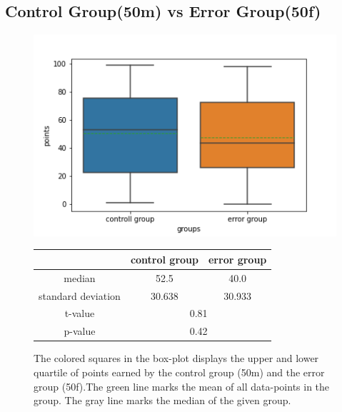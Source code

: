 \documentclass[runningheads]{llncs}
\begin{document}
\subsection{Control Group(50m) vs Error Group(50f)}
\begin{figure}
    \begin{minipage}{0.43\textwidth}        
        \includegraphics[width=\textwidth]{code/generate/all.png}
        \caption{The colored squares in the box-plot displays
        the upper and lower quartile of points earned by the control group (50m) and
        the error group (50f).The green line marks the mean of all data-points in the group.
        The gray line marks the median  of the given group.} \label{fig8}
    \end{minipage}
\hfill
\begin{minipage}{0.43\textwidth}
\begin{tabular}[]{| c | c | c |}
        \hline
        & control group & error group \\
        \hline
        median & 52.5&40.0 \\
        \hline
        standard deviation & 30.638&30.933 \\
        \hline
        t-value & \multicolumn{2}{c|}{0.81} \\
        \hline
        p-value & \multicolumn{2}{c|}{0.42} \\
        \hline            
\end{tabular}
\end{minipage}
\end{figure}
\end{document}
